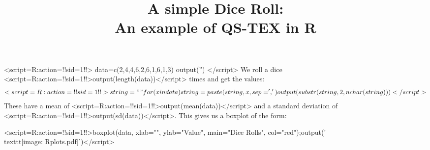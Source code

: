 \documentclass[a4paper,12pt,twocolum]{article}
\title{A simple Dice Roll:\\An example of QS-TEX in R}
\begin{document}
\maketitle
<script=R:action={!!sid=1!!}>
data=c(2,4,4,6,2,6,1,6,1,3)
output('')
</script>
We roll a dice <script=R:action={!!sid=1!!}>output(length(data))</script> times and get the values:
\[<script=R:action={!!sid=1!!}>
string=""
for(x in data){string=paste(string,x,sep=',')}
output(substr(string,2,nchar(string)))
</script>\]
These have a mean of <script=R:action={!!sid=1!!}>output(mean(data))</script> and a standard deviation of <script=R:action={!!sid=1!!}>output(sd(data))</script>. This gives us a boxplot of the form:
\begin{center}
<script=R:action={!!sid=1!!}>boxplot(data, xlab="", ylab="Value", main="Dice Rolls", col="red");output('\\texttt{[image: Rplots.pdf]}')</script> \end{center}
\end{document}
